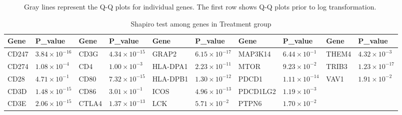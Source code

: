 \documentclass{report}
\begin{document}
\begin{figure}[!ht]
{\begin{minipage}{\textwidth}
\begin{subfigure}[b]{0.45\textwidth}
				\end{subfigure}
			\end{minipage}
		}
		\caption{Gray lines represent the Q-Q plots for individual genes. The first row shows Q-Q plots prior to log transformation.}
		\label{fig: qq-plots}
	\end{figure}
	
	\begin{table}[!ht]
		\begin{adjustwidth}{-0.1\textwidth}{-0.07\textwidth}
			\centering
			\begin{tabular}{|l|l|l|l|l|l|l|l|l|l|}
				\hline
				\textbf{Gene} & \textbf{P\_value} & \textbf{Gene} & \textbf{P\_value} & \textbf{Gene} & \textbf{P\_value} & \textbf{Gene} & \textbf{P\_value} & \textbf{Gene} & \textbf{P\_value} \\ \hline
				CD247 & \(3.84 \times 10^{-16}\) & CD3G & \(4.34 \times 10^{-15}\) & GRAP2 & \(6.15 \times 10^{-17}\) & MAP3K14 & \(6.44 \times 10^{-1}\) & THEM4 & \(4.32 \times 10^{-3}\) \\ \hline
				CD274 & \(1.08 \times 10^{-4}\) & CD4 & \(1.00 \times 10^{-3}\) & HLA-DPA1 & \(2.23 \times 10^{-11}\) & MTOR & \(9.23 \times 10^{-2}\) & TRIB3 & \(1.23 \times 10^{-17}\) \\ \hline
				CD28 & \(4.71 \times 10^{-1}\) & CD80 & \(7.32 \times 10^{-15}\) & HLA-DPB1 & \(1.30 \times 10^{-12}\) & PDCD1 & \(1.11 \times 10^{-14}\) & VAV1 & \(1.91 \times 10^{-2}\) \\ \hline
				CD3D & \(1.48 \times 10^{-15}\) & CD86 & \(3.01 \times 10^{-1}\) & ICOS & \(4.96 \times 10^{-13}\) & PDCD1LG2 & \(1.19 \times 10^{-3}\) & ~ &  \\ \hline
				CD3E & \(2.06 \times 10^{-15}\) & CTLA4 & \(1.37 \times 10^{-13}\) & LCK & \(5.71 \times 10^{-2}\) & PTPN6 & \(1.70 \times 10^{-2}\) & ~ &  \\ \hline
			\end{tabular}
			\caption{Shapiro test among genes in Treatment group}
			\label{tab:shapiro-treatment}
		\end{adjustwidth}
	\end{table}
	
\end{document}
